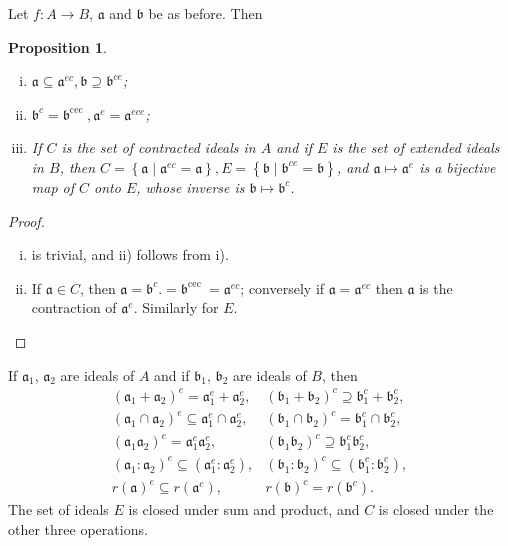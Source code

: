 \documentclass[class=book, crop=false]{standalone}
\newtheorem{proposition}[theorem]{Proposition}
\theoremstyle{definition}
\theoremstyle{remark}
\begin{document}
Let $f: A \to B$, $\mathfrak{a}$ and $\mathfrak{b}$ be as before. Then
\begin{proposition}
  \begin{enumerate}[i)]
    \item
          $\mathfrak{a} \subseteq \mathfrak{a}^{e c}, \mathfrak{b} \supseteq \mathfrak{b}^{c e}$;
    \item
          $\mathfrak{b}^{c}=\mathfrak{b}^{\text {cec }}, \mathfrak{a}^{e}=\mathfrak{a}^{e c e}$;
    \item If $C$ is the set of contracted ideals in $A$ and if $E$ is the set of
          extended ideals in $B$, then
          $C=\left\{\mathfrak{a} \mid \mathfrak{a}^{e c}=\mathfrak{a}\right\}, E=\left\{\mathfrak{b} \mid \mathfrak{b}^{c e}=\mathfrak{b}\right\}$,
          and $\mathfrak{a} \mapsto \mathfrak{a}^{e}$ is a bijective map of $C$
          onto $E$, whose inverse is $\mathfrak{b} \mapsto \mathfrak{b}^{c}$.
  \end{enumerate}
\end{proposition}
\begin{proof}
  \begin{enumerate}[i)]
    \item is trivial, and ii) follows from i).
    \item If $\mathfrak{a} \in C$, then
          $\mathfrak{a}=\mathfrak{b}^{c} .=\mathfrak{b}^{\text {cec }}=\mathfrak{a}^{e c}$;
          conversely if $\mathfrak{a}=\mathfrak{a}^{e c}$ then $\mathfrak{a}$ is
          the contraction of $\mathfrak{a}^{e}$. Similarly for $E$.
  \end{enumerate}
\end{proof}
\begin{exercise}
  If $\mathfrak{a}_{1}$, $\mathfrak{a}_{2}$ are ideals of $A$ and if
  $\mathfrak{b}_{1}$, $\mathfrak{b}_{2}$ are ideals of $B$, then
  \[
    \begin{array}{ll}
      \left(\mathfrak{a}_{1}+\mathfrak{a}_{2}\right)^{e}=\mathfrak{a}_{1}^{e}+\mathfrak{a}_{2}^{e}, & \left(\mathfrak{b}_{1}+\mathfrak{b}_{2}\right)^{c} \supseteq \mathfrak{b}_{1}^{c}+\mathfrak{b}_{2}^{c}, \\
      \left(\mathfrak{a}_{1} \cap \mathfrak{a}_{2}\right)^{e} \subseteq \mathfrak{a}_{1}^{e} \cap \mathfrak{a}_{2}^{e}, & \left(\mathfrak{b}_{1} \cap \mathfrak{b}_{2}\right)^{c}=\mathfrak{b}_{1}^{c} \cap \mathfrak{b}_{2}^{c}, \\
      \left(\mathfrak{a}_{1} \mathfrak{a}_{2}\right)^{e}=\mathfrak{a}_{1}^{e} \mathfrak{a}_{2}^{e}, & \left(\mathfrak{b}_{1} \mathfrak{b}_{2}\right)^{c} \supseteq \mathfrak{b}_{1}^{c} \mathfrak{b}_{2}^{c}, \\
      \left(\mathfrak{a}_{1}: \mathfrak{a}_{2}\right)^{e} \subseteq\left(\mathfrak{a}_{1}^{e}: \mathfrak{a}_{2}^{e}\right), & \left(\mathfrak{b}_{1}: \mathfrak{b}_{2}\right)^{c} \subseteq\left(\mathfrak{b}_{1}^{c}: \mathfrak{b}_{2}^{c}\right), \\
      r(\mathfrak{a})^{e} \subseteq r\left(\mathfrak{a}^{e}\right), & r(\mathfrak{b})^{c}=r\left(\mathfrak{b}^{c}\right).
    \end{array}
  \]
  The set of ideals $E$ is closed under sum and product, and $C$ is closed under
  the other three operations.
\end{exercise}
\end{document}
